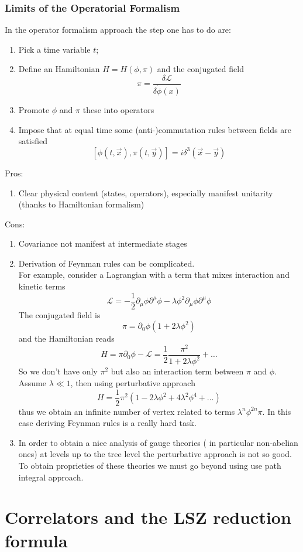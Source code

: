 \documentclass[../main/main.tex]{subfiles}
\begin{document}
\subsubsection{Limits of the Operatorial Formalism}
In the operator formalism approach the step one has to do are:
\begin{enumerate}
\item Pick a time variable $t$;
\item Define an Hamiltonian $H=H(\phi, \pi)$ and the conjugated field 
\[\pi=\frac{\delta\mathcal L}{\delta\dot\phi(x)}\]
\item Promote $\phi$ and $\pi$ these into operators
\item Impose that at equal time some (anti-)commutation rules between fields are satisfied
\[[\phi(t,\vec x),\pi(t,\vec y)]=i\delta^3(\vec x-\vec y)\]
\end{enumerate}
Pros: 
\begin{enumerate}
\item Clear physical content (states, operators), especially manifest unitarity (thanks to Hamiltonian formalism)
\end{enumerate}
Cons:
\begin{enumerate}
\item Covariance not manifest at intermediate stages
\item Derivation of Feynman rules can be complicated.\\
For example, consider a Lagrangian with a term that mixes interaction and kinetic terms
\[\mathcal L =-\frac12\partial_\mu\phi\partial^\mu\phi-\lambda\phi^2\partial_\mu\phi\partial^\mu\phi\]
The conjugated field is 
\[\pi=\partial_0\phi(1+2\lambda\phi^2)\]
and the Hamiltonian reads
\[H=\pi\partial_0\phi-\mathcal L=\frac12\frac{\pi^2}{1+2\lambda\phi^2}+\dots\]
So we don't have only $\pi^2$ but also an interaction term between $\pi$ and $\phi$. Assume $\lambda\ll1$, then using perturbative approach
\[H=\frac12\pi^2(1-2\lambda\phi^2+4\lambda^2\phi^4+\dots)\]
thus we obtain an infinite number of vertex related to terms $\lambda^n\phi^{2n}\pi$.
In this case deriving Feynman rules is a really hard task.
\item  In order to obtain a nice analysis of gauge theories ( in particular non-abelian ones) at levels up to the tree level the perturbative approach is not so good. To obtain proprieties of these theories we must go beyond using use path integral approach.
\end{enumerate}


\section{Correlators and the LSZ reduction formula}
\end{document}
